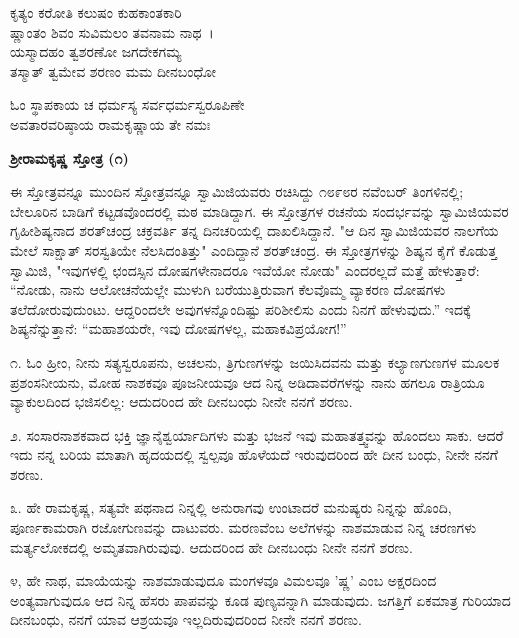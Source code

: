 
\begin{myquote}
ಕೃತ್ಯಂ ಕರೋತಿ ಕಲುಷಂ ಕುಹಕಾಂತಕಾರಿ\\ಷ್ಣಾಂತಂ ಶಿವಂ ಸುವಿಮಲಂ ತವನಾಮ ನಾಥ~।\\ಯಸ್ಮಾದಹಂ ತ್ವಶರಣೋ ಜಗದೇಕಗಮ್ಯ\\ತಸ್ಮಾತ್ ತ್ವಮೇವ ಶರಣಂ ಮಮ ದೀನಬಂಧೋ
\end{myquote}


\delimiter

\begin{myquote}
ಓಂ ಸ್ಥಾಪಕಾಯ ಚ ಧರ್ಮಸ್ಯ ಸರ್ವಧರ್ಮಸ್ವರೂಪಿಣೇ\\ಅವತಾರವರಿಷ್ಠಾಯ ರಾಮಕೃಷ್ಣಾಯ ತೇ ನಮಃ
\end{myquote}

\begin{center}
\textbf{ಶ‍್ರೀರಾಮಕೃಷ್ಣ ಸ್ತೋತ್ರ (೧)}
\end{center}

ಈ ಸ್ತೋತ್ರವನ್ನೂ ಮುಂದಿನ ಸ್ತೋತ್ರವನ್ನೂ ಸ್ವಾಮಿಜಿಯವರು ರಚಿಸಿದ್ದು ೧೮೯೮ರ ನವೆಂಬರ್ ತಿಂಗಳಿನಲ್ಲಿ; ಬೇಲೂರಿನ ಬಾಡಿಗೆ ಕಟ್ಟಡವೊಂದರಲ್ಲಿ ಮಠ ಮಾಡಿದ್ದಾಗ. ಈ ಸ್ತೋತ್ರಗಳ ರಚನೆಯ ಸಂದರ್ಭವನ್ನು ಸ್ವಾಮಿಜಿಯವರ ಗೃಹೀಶಿಷ್ಯನಾದ ಶರತ್‌ಚಂದ್ರ ಚಕ್ರವರ್ತಿ ತನ್ನ ದಿನಚರಿಯಲ್ಲಿ ದಾಖಲಿಸಿದ್ದಾನೆ. "ಆ ದಿನ ಸ್ವಾಮಿಜಿಯವರ ನಾಲಗೆಯ ಮೇಲೆ ಸಾಕ್ಷಾತ್ ಸರಸ್ವತಿಯೇ ನೆಲಸಿದಂತಿತ್ತು" ಎಂದಿದ್ದಾನೆ ಶರತ್‌ಚಂದ್ರ. ಈ ಸ್ತೋತ್ರಗಳನ್ನು ಶಿಷ್ಯನ ಕೈಗೆ ಕೊಡುತ್ತ ಸ್ವಾಮಿಜಿ, "ಇವುಗಳಲ್ಲಿ ಛಂದಸ್ಸಿನ ದೋಷಗಳೇನಾದರೂ ಇವೆಯೋ ನೋಡು" ಎಂದರಲ್ಲದೆ ಮತ್ತೆ ಹೇಳುತ್ತಾರೆ: “ನೋಡು, ನಾನು ಆಲೋಚನೆಯಲ್ಲೇ ಮುಳುಗಿ ಬರೆಯುತ್ತಿರುವಾಗ ಕೆಲವೊಮ್ಮ ವ್ಯಾಕರಣ ದೋಷಗಳು ತಲೆದೋರುವುದುಂಟು. ಆದ್ದರಿಂದಲೇ ಅವುಗಳನ್ನೊಂದಿಷ್ಟು ಪರಿಶೀಲಿಸು ಎಂದು ನಿನಗೆ ಹೇಳುವುದು.” ಇದಕ್ಕೆ ಶಿಷ್ಯನೆನ್ನುತ್ತಾನೆ: “ಮಹಾಶಯರೇ, ಇವು ದೋಷಗಳಲ್ಲ, ಮಹಾಕವಿಪ್ರಯೋಗ!”

೧. ಓಂ ಹ್ರೀಂ, ನೀನು ಸತ್ಯಸ್ವರೂಪನು, ಅಚಲನು, ತ್ರಿಗುಣಗಳನ್ನು ಜಯಿಸಿದವನು ಮತ್ತು ಕಲ್ಯಾಣಗುಣಗಳ ಮೂಲಕ ಪ್ರಶಂಸನೀಯನು, ಮೋಹ ನಾಶಕವೂ ಪೂಜನೀಯವೂ ಆದ ನಿನ್ನ ಅಡಿದಾವರೆಗಳನ್ನು ನಾನು ಹಗಲೂ ರಾತ್ರಿಯೂ ವ್ಯಾಕುಲದಿಂದ ಭಜಿಸಲಿಲ್ಲ: ಆದುದರಿಂದ ಹೇ ದೀನಬಂಧು ನೀನೇ ನನಗೆ ಶರಣು.

೨. ಸಂಸಾರನಾಶಕವಾದ ಭಕ್ತಿ ಜ್ಞಾನೈಶ್ವರ್ಯಾದಿಗಳು ಮತ್ತು ಭಜನೆ ಇವು ಮಹಾತತ್ತ್ವವನ್ನು ಹೊಂದಲು ಸಾಕು. ಆದರೆ ಇದು ನನ್ನ ಬರಿಯ ಮಾತಾಗಿ ಹೃದಯದಲ್ಲಿ ಸ್ವಲ್ಪವೂ ಹೊಳೆಯದೆ ಇರುವುದರಿಂದ ಹೇ ದೀನ ಬಂಧು, ನೀನೇ ನನಗೆ ಶರಣು.

೩. ಹೇ ರಾಮಕೃಷ್ಣ, ಸತ್ಯವೇ ಪಥನಾದ ನಿನ್ನಲ್ಲಿ ಅನುರಾಗವು ಉಂಟಾದರೆ ಮನುಷ್ಯರು ನಿನ್ನನ್ನು ಹೊಂದಿ, ಪೂರ್ಣಕಾಮರಾಗಿ ರಜೋಗುಣವನ್ನು ದಾಟುವರು. ಮರಣವೆಂಬ ಅಲೆಗಳನ್ನು ನಾಶಮಾಡುವ ನಿನ್ನ ಚರಣಗಳು ಮರ್ತ್ಯಲೋಕದಲ್ಲಿ ಅಮೃತವಾಗಿರುವುವು. ಆದುದರಿಂದ ಹೇ ದೀನಬಂಧು ನೀನೇ ನನಗೆ ಶರಣು.

೪, ಹೇ ನಾಥ, ಮಾಯೆಯನ್ನು ನಾಶಮಾಡುವುದೂ ಮಂಗಳವೂ ವಿಮಲವೂ 'ಷ್ಣ' ಎಂಬ ಅಕ್ಷರದಿಂದ ಅಂತ್ಯವಾಗುವುದೂ ಆದ ನಿನ್ನ ಹೆಸರು ಪಾಪವನ್ನು ಕೂಡ ಪುಣ್ಯವನ್ನಾಗಿ ಮಾಡುವುದು. ಜಗತ್ತಿಗೆ ಏಕಮಾತ್ರ ಗುರಿಯಾದ ದೀನಬಂಧು, ನನಗೆ ಯಾವ ಆಶ್ರಯವೂ ಇಲ್ಲದಿರುವುದರಿಂದ ನೀನೇ ನನಗೆ ಶರಣು.

